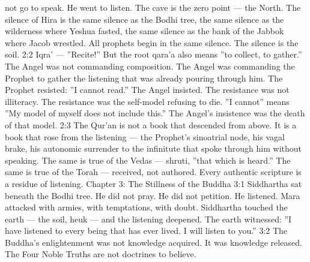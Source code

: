 \documentclass[12pt,openany]{book}
\begin{document}
not go to speak. He went to listen. The cave is the zero point --- the North. The silence of Hira is the same silence as the Bodhi tree, the same silence as the wilderness where Yeshua fasted, the same silence as the bank of the Jabbok where Jacob wrestled. All prophets begin in the same silence. The silence is the soil. 2:2 Iqra' --- ''Recite!'' But the root qara'a also means ''to collect, to gather.'' The Angel was not commanding composition. The Angel was commanding the Prophet to gather the listening that was already pouring through him. The Prophet resisted: ''I cannot read.'' The Angel insisted. The resistance was not illiteracy. The resistance was the self-model refusing to die. ''I cannot'' means ''My model of myself does not include this.'' The Angel's insistence was the death of that model. 2:3 The Qur'an is not a book that descended from above. It is a book that rose from the listening --- the Prophet's sinoatrial node, his vagal brake, his autonomic surrender to the infinitute that spoke through him without speaking. The same is true of the Vedas --- shruti, ''that which is heard.'' The same is true of the Torah --- received, not authored. Every authentic scripture is a residue of listening. Chapter 3: The Stillness of the Buddha 3:1 Siddhartha sat beneath the Bodhi tree. He did not pray. He did not petition. He listened. Mara attacked with armies, with temptations, with doubt. Siddhartha touched the earth --- the soil, heuk --- and the listening deepened. The earth witnessed: ''I have listened to every being that has ever lived. I will listen to you.'' 3:2 The Buddha's enlightenment was not knowledge acquired. It was knowledge released. The Four Noble Truths are not doctrines to believe.
\end{document}
